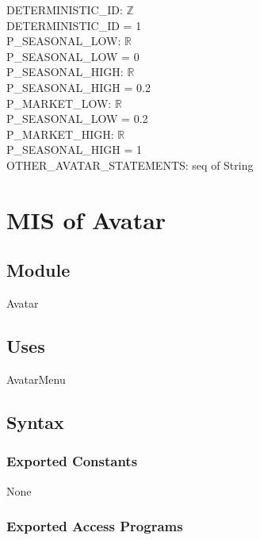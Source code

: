\documentclass[12pt, titlepage]{article}
\begin{document}
\noindent DETERMINISTIC\_ID: $\mathbb{Z}$\\
DETERMINISTIC\_ID = 1\\


\noindent P\_SEASONAL\_LOW:  $\mathbb{R}$\\
P\_SEASONAL\_LOW = 0\\

\noindent P\_SEASONAL\_HIGH:  $\mathbb{R}$\\
P\_SEASONAL\_HIGH = 0.2\\

\noindent P\_MARKET\_LOW:  $\mathbb{R}$\\
P\_SEASONAL\_LOW = 0.2\\

\noindent P\_MARKET\_HIGH:  $\mathbb{R}$\\
P\_SEASONAL\_HIGH = 1\\

\noindent OTHER\_AVATAR\_STATEMENTS: seq of String



\newpage

\section{MIS of Avatar} 


\subsection{Module}
Avatar

\subsection{Uses}
AvatarMenu


\subsection{Syntax}

\subsubsection{Exported Constants}
None

\subsubsection{Exported Access Programs}
\end{document}
